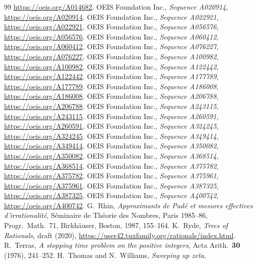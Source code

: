 \documentclass[11pt,a4paper,titlepage]{article}
\begin{document}
\begin{thebibliography}{99}
  \url{https://oeis.org/A014682}.
 OEIS Foundation Inc., \emph{Sequence A020914},
  \url{https://oeis.org/A020914}.
 OEIS Foundation Inc., \emph{Sequence A022921},
  \url{https://oeis.org/A022921}.
 OEIS Foundation Inc., \emph{Sequence A056576},
  \url{https://oeis.org/A056576}.
 OEIS Foundation Inc., \emph{Sequence A060412},
  \url{https://oeis.org/A060412}.
 OEIS Foundation Inc., \emph{Sequence A076227},
  \url{https://oeis.org/A076227}.
 OEIS Foundation Inc., \emph{Sequence A100982},
  \url{https://oeis.org/A100982}.
 OEIS Foundation Inc., \emph{Sequence A122442},
  \url{https://oeis.org/A122442}.
 OEIS Foundation Inc., \emph{Sequence A177789},
  \url{https://oeis.org/A177789}.
 OEIS Foundation Inc., \emph{Sequence A186008},
  \url{https://oeis.org/A186008}.
 OEIS Foundation Inc., \emph{Sequence A206788},
  \url{https://oeis.org/A206788}.
 OEIS Foundation Inc., \emph{Sequence A243115},
  \url{https://oeis.org/A243115}.
 OEIS Foundation Inc., \emph{Sequence A260591},
  \url{https://oeis.org/A260591}.
 OEIS Foundation Inc., \emph{Sequence A324245},
  \url{https://oeis.org/A324245}.
 OEIS Foundation Inc., \emph{Sequence A349414},
  \url{https://oeis.org/A349414}.
 OEIS Foundation Inc., \emph{Sequence A350082},
  \url{https://oeis.org/A350082}.
 OEIS Foundation Inc., \emph{Sequence A368514},
  \url{https://oeis.org/A368514}.
 OEIS Foundation Inc., \emph{Sequence A375782},
  \url{https://oeis.org/A375782}.
 OEIS Foundation Inc., \emph{Sequence A375961},
  \url{https://oeis.org/A375961}.
 OEIS Foundation Inc., \emph{Sequence A387325},
  \url{https://oeis.org/A387325}.
 OEIS Foundation Inc., \emph{Sequence A400742},
  \url{https://oeis.org/A400742}.
 G.~Rhin, \emph{Approximants de Pad\'e et mesures effectives
  d'irrationalit\'e}, S\'eminaire de Th\'eorie des Nombres, Paris 1985--86,
  Progr.\ Math.\ 71, Birkh\"auser, Boston, 1987, 155--164.
 K.~Ryde, \emph{Trees of Rationals}, draft (2020),
  \url{https://user42.tuxfamily.org/rationals/index.html}.
 R.~Terras, \emph{A stopping time problem on the positive
  integers}, Acta Arith.\ \textbf{30} (1976), 241--252.
 H.~Thomas and N.~Williams, \emph{Sweeping up zeta},

\end{thebibliography}
\end{document}
